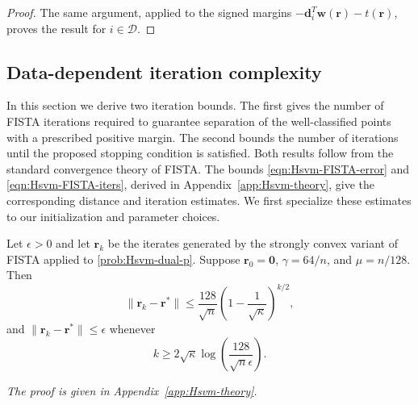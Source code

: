 \documentclass[twoside,11pt]{article}
\newcommand\bz{\bm{0}}
\renewcommand{\d}{\bm{d}}
\renewcommand\r{\bm{r}}
\newcommand\w{\bm{w}}
\newcommand\DD{\mathcal{D}}
\begin{document}
\begin{proof}
        The same argument, applied to the signed margins $-\d_i^T\w(\r) - t(\r)$, proves the result for $i \in \DD$.
    \end{proof}
    
\subsection{Data-dependent iteration complexity} \label{sec:iteration-complexity}
In this section we derive two iteration bounds. The first gives the number of FISTA iterations required to guarantee separation of the well-classified points with a prescribed positive margin. The second bounds the number of iterations until the proposed stopping condition is satisfied. Both results follow from the standard convergence theory of FISTA. The bounds \eqref{eqn:Hsvm-FISTA-error} and \eqref{eqn:Hsvm-FISTA-iters}, derived in Appendix~\ref{app:Hsvm-theory}, give the corresponding distance and iteration estimates. We first specialize these estimates to our initialization and parameter choices.

\begin{theorem} \label{thm:fista-Delta-sep-iters}
    Let $\epsilon > 0$ and let $\r_k$ be the iterates generated by the strongly convex variant of FISTA applied to \eqref{prob:Hsvm-dual-p}. Suppose $\r_0=\bz$, $\gamma=64/n$, and $\mu=n/128$. Then
    \[
        \|\r_k-\r^*\| \leq \frac{128}{\sqrt{n}}\left(1-\frac{1}{\sqrt{\kappa}}\right)^{k/2},
    \]
    and $\|\r_k - \r^*\| \leq \epsilon$ whenever
    \[
        k \geq 2\sqrt{\kappa}\log\left(\frac{128}{\sqrt{n}\epsilon}\right).
    \]
\end{theorem}
\noindent\emph{The proof is given in Appendix~\ref{app:Hsvm-theory}.}
\end{document}

